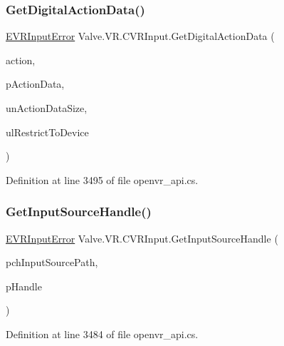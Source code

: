 \subsubsection{\texorpdfstring{GetDigitalActionData()}{GetDigitalActionData()}}
{\footnotesize\ttfamily \mbox{\hyperlink{namespace_valve_1_1_v_r_a592d7f4189b8346d6c96dbdbaa35bc1b}{E\+V\+R\+Input\+Error}} Valve.\+V\+R.\+C\+V\+R\+Input.\+Get\+Digital\+Action\+Data (\begin{DoxyParamCaption}\item[{ulong}]{action,  }\item[{ref \mbox{\hyperlink{struct_valve_1_1_v_r_1_1_input_digital_action_data__t}{Input\+Digital\+Action\+Data\+\_\+t}}}]{p\+Action\+Data,  }\item[{uint}]{un\+Action\+Data\+Size,  }\item[{ulong}]{ul\+Restrict\+To\+Device }\end{DoxyParamCaption})}



Definition at line 3495 of file openvr\+\_\+api.\+cs.

\mbox{\label{class_valve_1_1_v_r_1_1_c_v_r_input_a26142f29606f17823f465e181892a0ab}} 
\subsubsection{\texorpdfstring{GetInputSourceHandle()}{GetInputSourceHandle()}}
{\footnotesize\ttfamily \mbox{\hyperlink{namespace_valve_1_1_v_r_a592d7f4189b8346d6c96dbdbaa35bc1b}{E\+V\+R\+Input\+Error}} Valve.\+V\+R.\+C\+V\+R\+Input.\+Get\+Input\+Source\+Handle (\begin{DoxyParamCaption}\item[{string}]{pch\+Input\+Source\+Path,  }\item[{ref ulong}]{p\+Handle }\end{DoxyParamCaption})}



Definition at line 3484 of file openvr\+\_\+api.\+cs.

\mbox{\label{class_valve_1_1_v_r_1_1_c_v_r_input_ab948e02dd80ff0dbafdcf374182c283f}} 
